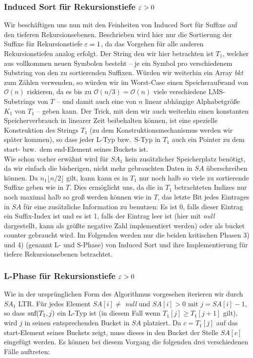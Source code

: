 \subsubsection{ Induced Sort für Rekursionstiefe $\varepsilon > 0$}

Wir beschäftigen uns nun mit den Feinheiten von Induced Sort für Suffixe auf den tieferen Rekursionsebenen. Beschrieben wird hier nur die Sortierung der Suffixe für Rekursionstiefe $\varepsilon = 1$, da das Vorgehen für alle anderen Rekursionstiefen analog erfolgt. Der String den wir hier betrachten ist $T_1$, welcher aus vollkommen neuen Symbolen besteht -- je ein Symbol pro verschiedenem Substring von den zu sortierenden Suffixen. Würden wir weiterhin ein Array \textit{bkt} zum Zählen verwenden, so würden wir im Worst-Case einen Speicheraufwand von $\mathcal O(n)$ riskieren, da es bis zu $\mathcal O(n/3) = \mathcal O(n)$ viele verschiedene LMS-Substrings von $T$ -- und damit auch eine von $n$ linear abhängige Alphabetgröße $K_1$ von $T_1$ -- geben kann. Der Trick, mit dem wir auch weiterhin einen konstanten Speicherverbrauch in linearer Zeit beibehalten können, ist eine spezielle Konstruktion des Strings $T_1$ (zu dem Konstruktionsmechanismus werden wir später kommen), so dass jeder L-Typ bzw.\ S-Typ in $T_1$ auch ein Pointer zu dem start- bzw.\ dem end-Element seines Buckets ist.  \\
Wie schon vorher erwähnt wird für $SA_1$ kein zusätzlicher Speicherplatz benötigt, da wir einfach die bisherigen, nicht mehr gebrauchten Daten in $SA$ überschreiben können. Da $n_1 \lfloor n/2 \rfloor$ gilt, kann kann es in $T_1$ nur noch halb so viele zu sortierende Suffixe geben wie in $T$. Dies ermöglicht uns, da die in $T_1$ betrachteten Indizes nur noch maximal halb so groß werden können wie in $T$, das letzte Bit jedes Eintrages in $SA$ für eine zusätzliche Information zu benutzen: Es ist 0, falls dieser Eintrag ein Suffix-Index ist und es ist 1, falls der Eintrag leer ist (hier mit \textit{null} dargestellt, kann als größte negative Zahl implementiert werden) oder als bucket counter gebraucht wird. Im Folgenden werden nur die beiden kritischen Phasen 3) und 4) (genannt L- und S-Phase) von Induced Sort und ihre Implementierung für tiefere Rekursionsebenen betrachtet.

\subsubsection{ L-Phase für Rekursionstiefe $\varepsilon > 0$}

Wie in der ursprünglichen Form des Algorithmus vorgesehen iterieren wir durch $SA_1$ LTR. Für jedes Element $SA[i] \neq $ \textit{null} und $SA[i] > 0$ mit $j = SA[i] -1$, so dass $\text{suf}(T_1,j)$ ein L-Typ ist (in diesem Fall wenn $T_1[j] \geq T_1[j+1]$ gilt), wird $j$ in seinen entsprechenden Bucket in $SA$ platziert. Da $c = T_1[j]$ auf das start-Element seines Buckets zeigt, muss dieses in den Bucket der Stelle $SA[c]$ eingefügt werden. Es können bei diesem Vorgang die folgenden drei verschiedenen Fälle auftreten:

